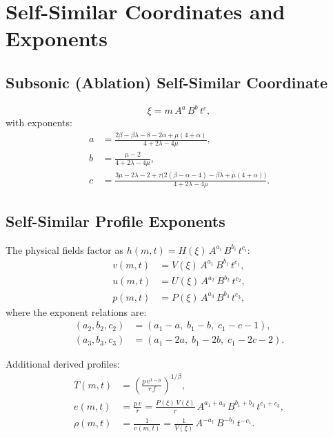 \documentclass[11pt]{article}
\newcommand{\xsi}{\xi}
\begin{document}
\section{Self-Similar Coordinates and Exponents}
\label{sec:exponents}

\subsection{Subsonic (Ablation) Self-Similar Coordinate}

\begin{equation}
  \xsi = m\,A^{a}\,B^{b}\,t^{c},
\end{equation}
with exponents:
\begin{align}
  a &= \frac{2\beta - \beta\lambda - 8 - 2\alpha + \mu(4+\alpha)}
            {4 + 2\lambda - 4\mu}, \\
  b &= \frac{\mu - 2}{4 + 2\lambda - 4\mu}, \\
  c &= \frac{3\mu - 2\lambda - 2
             + \tau\bigl(2(\beta-\alpha-4) - \beta\lambda + \mu(4+\alpha)\bigr)}
            {4 + 2\lambda - 4\mu}.
\end{align}

\subsection{Self-Similar Profile Exponents}

The physical fields factor as $h(m,t) = H(\xsi)\,A^{a_i}\,B^{b_i}\,t^{c_i}$:
\begin{align}
  v(m,t) &= V(\xsi)\,A^{a_1}\,B^{b_1}\,t^{c_1}, \\
  u(m,t) &= U(\xsi)\,A^{a_2}\,B^{b_2}\,t^{c_2}, \\
  p(m,t) &= P(\xsi)\,A^{a_3}\,B^{b_3}\,t^{c_3},
\end{align}
where the exponent relations are:
\begin{align}
  (a_2, b_2, c_2) &= (a_1 - a,\; b_1 - b,\; c_1 - c - 1), \\
  (a_3, b_3, c_3) &= (a_1 - 2a,\; b_1 - 2b,\; c_1 - 2c - 2).
\end{align}

Additional derived profiles:
\begin{align}
  T(m,t) &= \left(\frac{p\,v^{1-\mu}}{r\,f}\right)^{1/\beta}, \\
  e(m,t) &= \frac{p\,v}{r} = \frac{P(\xsi)\,V(\xsi)}{r}\,A^{a_1+a_3}\,B^{b_1+b_3}\,t^{c_1+c_3}, \\
  \rho(m,t) &= \frac{1}{v(m,t)} = \frac{1}{V(\xsi)}\,A^{-a_1}\,B^{-b_1}\,t^{-c_1}.
\end{align}
\end{document}
